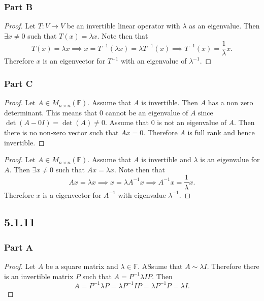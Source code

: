 \documentclass[12pt,titlepage]{extarticle}
\begin{document}
\subsubsection*{Part B}
\begin{proof}
    Let $T : V \to V$ be an invertible linear operator with $\lambda$ as an eigenvalue. Then $\exists x \neq 0$ such that $T(x) = \lambda x$. Note then that
    \[
        T(x) = \lambda x \implies x = T^{-1}(\lambda x) = \lambda T^{-1}(x) \implies T^{-1}(x) = \frac{1}{\lambda} x
    .\]
    Therefore $x$ is an eigenvector for $T^{-1}$ with an eigenvalue of $\lambda^{-1}$.
\end{proof}

\subsubsection*{Part C}
\begin{proof}
    Let $A \in M_{n\times n}(\mathbb{F})$. Assume that $A$ is invertible. Then $A$ has a non zero determinant. This means that $0$ cannot be an eigenvalue of $A$ since $\det(A - 0I) = \det(A) \neq 0$. Assume that $0$ is not an eigenvalue of $A$. Then there is no non-zero vector such that $Ax = 0$. Therefore $A$ is full rank and hence invertible.
\end{proof}
\begin{proof}
    Let $A \in M_{n\times n}(\mathbb{F})$. Assume that $A$ is invertible and $\lambda$ is an eigenvalue for $A$. Then $\exists x \neq 0$ such that $Ax = \lambda x$. Note then that
    \[
        Ax = \lambda x \implies x = \lambda A^{-1} x \implies A^{-1} x = \frac{1}{\lambda} x
    .\]
    Therefore $x$ is a eigenvector for $A^{-1}$ with eigenvalue $\lambda^{-1}$.
\end{proof}


\subsection*{5.1.11}
\subsubsection*{Part A}
\begin{proof}
    Let $A$ be a square matrix and $\lambda \in \mathbb{F}$. ASsume that $A \sim \lambda I$. Therefore there is an invertible matrix $P$ such that $A = P^{-1} \lambda I P$. Then
    \[
        A = P^{-1} \lambda P = \lambda P^{-1} I P = \lambda P^{-1} P = \lambda I
    .\]
\end{proof}
\end{document}
